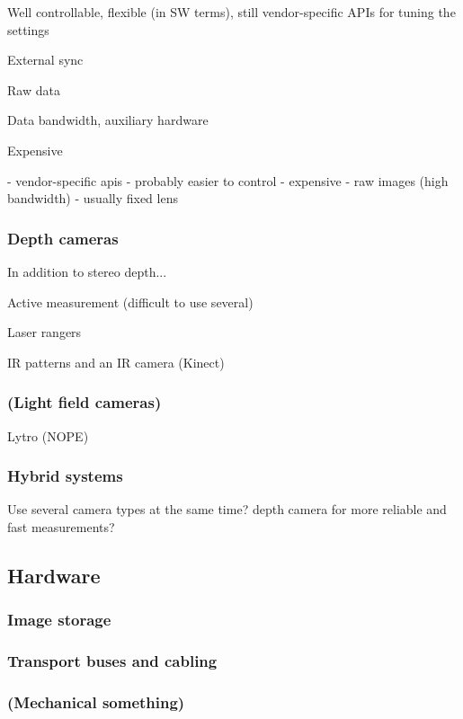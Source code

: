 Well controllable, flexible (in SW terms), still vendor-specific APIs for tuning the settings

External sync

Raw data

Data bandwidth, auxiliary hardware

Expensive

- vendor-specific apis
- probably easier to control
- expensive
- raw images (high bandwidth)
- usually fixed lens
\subsubsection{Depth cameras}

In addition to stereo depth...

Active measurement (difficult to use several)

Laser rangers

IR patterns and an IR camera (Kinect)

\subsubsection{(Light field cameras)}

Lytro (NOPE)

\subsubsection{Hybrid systems}

Use several camera types at the same time? depth camera for more reliable and fast measurements?


\subsection{Hardware}

\subsubsection{Image storage}

\subsubsection{Transport buses and cabling}

\subsubsection{(Mechanical something)}

